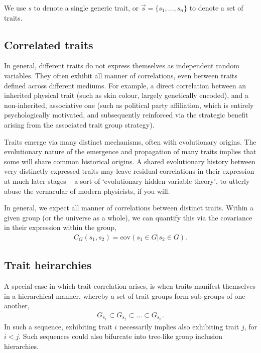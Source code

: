 \documentclass[twocolumn, aps, rmp, amsmath, amssymb, nofootinbib, superscriptaddress, longbibliography, floatfix, table-of-contents, eqsecnum]{revtex4-1}
\begin{document}
We use $s$ to denote a single generic trait, or $\vec s=\{s_1,\dots,s_n\}$ to denote a set of traits.

\subsection{Correlated traits}

In general, different traits do not express themselves as independent random variables. They often exhibit all manner of correlations, even between traits defined across different mediums. For example, a direct correlation between an inherited physical trait (such as skin colour, largely genetically encoded), and a non-inherited, associative one (such as political party affiliation, which is entirely psychologically motivated, and subsequently reinforced via the strategic benefit arising from the associated trait group strategy).

Traits emerge via many distinct mechanisms, often with evolutionary origins. The evolutionary nature of the emergence and propagation of many traits implies that some will share common historical origins. A shared evolutionary history between very distinctly expressed traits may leave residual correlations in their expression at much later stages -- a sort of `evolutionary hidden variable theory', to utterly abuse the vernacular of modern physicists, if you will.

In general, we expect all manner of correlations between distinct traits. Within a given group (or the universe as a whole), we can quantify this via the covariance in their expression within the group,
\begin{align}
C_G(s_1,s_2) = \text{cov}(s_1\in G | s_2\in G).
\end{align}

\subsection{Trait heirarchies}

A special case in which trait correlation arises, is when traits manifest themselves in a hierarchical manner, whereby a set of trait groups form sub-groups of one another,
\begin{align}
G_{s_1} \subset G_{s_2} \subset \dots \subset G_{s_n}.
\end{align}
In such a sequence, exhibiting trait $i$ necessarily implies also exhibiting trait $j$, for \mbox{$i<j$}. Such sequences could also bifurcate into tree-like group inclusion hierarchies.
\end{document}
